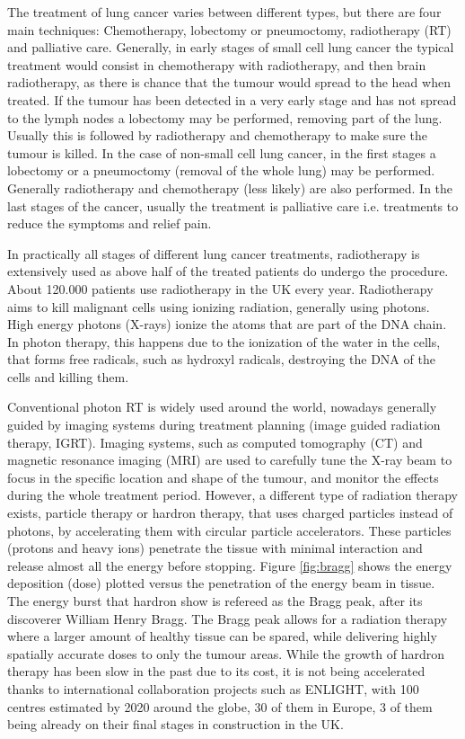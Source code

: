 The treatment of lung cancer varies between different types, but there are four main techniques: Chemotherapy, lobectomy or pneumoctomy, radiotherapy (RT) and palliative care. Generally, in early stages of small cell lung cancer the typical treatment would consist in chemotherapy with radiotherapy, and then brain radiotherapy, as there is chance that the tumour would spread to the head when treated. If the tumour has been detected in a very early stage and has not spread to the lymph nodes a lobectomy may be performed, removing part of the lung. Usually this is followed by radiotherapy and chemotherapy to make sure the tumour is killed.
In the case of non-small cell lung cancer, in the first stages a lobectomy or a pneumoctomy (removal of the whole lung) may be performed. Generally radiotherapy and chemotherapy (less likely) are also performed. In the last stages of the cancer, usually the treatment is palliative care i.e. treatments to reduce the symptoms and relief pain\cite{CRUK2014b}.

In practically all stages of different lung cancer treatments, radiotherapy is extensively used as above half of the treated patients do undergo the procedure\cite{Cancerorg}. About 120.000 patients use radiotherapy in the UK every year. Radiotherapy aims to kill malignant cells using ionizing radiation, generally using photons. High energy photons (X-rays) ionize the atoms that are part of the DNA chain. In photon therapy, this happens due to the ionization of the water in the cells, that forms free radicals, such as hydroxyl radicals, destroying the DNA of the cells and killing them.

Conventional photon RT is widely used around the world, nowadays generally guided by imaging systems during treatment planning (image guided radiation therapy, IGRT). Imaging systems, such as computed tomography (CT) and magnetic resonance imaging (MRI) are used to carefully tune the X-ray beam to focus in the specific location and shape of the tumour, and monitor the effects during the whole treatment period. However, a different type of radiation therapy exists, particle therapy or hardron therapy, that uses charged particles instead of photons, by accelerating them with circular particle accelerators. These particles (protons and heavy ions)  penetrate the tissue with minimal interaction and release almost all the energy before stopping. Figure \ref{fig:bragg} shows the energy deposition (dose) plotted versus the penetration of the energy beam in tissue. The energy burst that hardron show is refereed as the Bragg peak, after its discoverer William Henry Bragg. The Bragg peak allows for a radiation therapy where a larger amount of healthy tissue can be spared, while delivering highly spatially accurate doses to only the tumour areas. While the growth of hardron therapy has been slow in the past due to its cost, it is not being accelerated thanks to international collaboration projects such as ENLIGHT\cite{dosanjhparticle}, with 100 centres estimated by 2020 around the globe, 30 of them in Europe, 3 of them being already on their final stages in construction in the UK.

